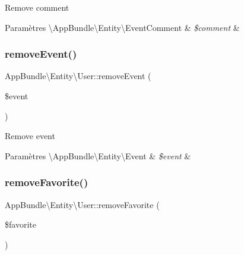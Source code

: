 Remove comment


\begin{DoxyParams}[1]{Paramètres}
\textbackslash{}\+App\+Bundle\textbackslash{}\+Entity\textbackslash{}\+Event\+Comment & {\em \$comment} & \\
\hline
\end{DoxyParams}
\mbox{\label{classAppBundle_1_1Entity_1_1User_a489a840a6fda94d0d811cd4c6294357f}} 
\subsubsection{\texorpdfstring{remove\+Event()}{removeEvent()}}
{\footnotesize\ttfamily App\+Bundle\textbackslash{}\+Entity\textbackslash{}\+User\+::remove\+Event (\begin{DoxyParamCaption}\item[{\textbackslash{}\hyperlink{classAppBundle_1_1Entity_1_1Event}{App\+Bundle\textbackslash{}\+Entity\textbackslash{}\+Event}}]{\$event }\end{DoxyParamCaption})}

Remove event


\begin{DoxyParams}[1]{Paramètres}
\textbackslash{}\+App\+Bundle\textbackslash{}\+Entity\textbackslash{}\+Event & {\em \$event} & \\
\hline
\end{DoxyParams}
\mbox{\label{classAppBundle_1_1Entity_1_1User_af7cb4c6bea6a124059f98953dd77d21b}} 
\subsubsection{\texorpdfstring{remove\+Favorite()}{removeFavorite()}}
{\footnotesize\ttfamily App\+Bundle\textbackslash{}\+Entity\textbackslash{}\+User\+::remove\+Favorite (\begin{DoxyParamCaption}\item[{\textbackslash{}\hyperlink{classAppBundle_1_1Entity_1_1Favorite}{App\+Bundle\textbackslash{}\+Entity\textbackslash{}\+Favorite}}]{\$favorite }\end{DoxyParamCaption})}

